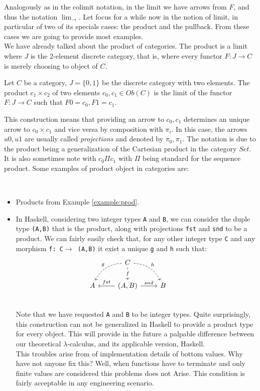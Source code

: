 Analogously as in the colimit notation, in the limit we have arrows from $F$, and thus the notation $\lim_{\rightarrow}$. Let focus for a while now in the notion of limit, in particular of two of its specials cases: the product and the pullback. From these cases we are going to provide most examples. \\

We have already talked about the product of categories. The product is a limit where $J$ is the 2-element discrete category, that is, where every functor $F:J\to C$ is merely choosing to object of $C$. 

\begin{definition}\label{prod-univ}
  Let $C$ be a category, $J=\{0,1\}$ be the discrete category with two elements. The product $c_1\times c_2$ of two elements $c_0,c_1\in Ob(C)$ is the limit of the functor $F:J\to C$ such that $F0 = c_0, F1= c_1$.
\end{definition}

This construction means that providing an arrow to $c_0,c_1$ determines an unique arrow to $c_0\times c_1$ and vice versa by composition with $\pi_i$. In this case, the arrows $u0, u1$ are usually called \emph{projections} and denoted by $\pi_0, \pi_1$. The notation is due to the product being a generalization of the Cartesian product in the category $Set$. It is also sometimes note with $c_0 \Pi c_1$ with $\Pi$ being standard for the sequence product. Some examples of product object in categories are:
\begin{example}\ 
\begin{itemize}
\item Products from Example \ref{example:prod}.
\item In Haskell, considering two integer types \texttt{A} and \texttt{B}, we can consider the duple type \texttt{(A,B)} that is the product, along with projections \texttt{fst} and \texttt{snd} to be a product. We can fairly easily check that, for any other integer type \texttt{C} and any morphism \texttt{f: C$\to$ (A,B)} it exist a unique \texttt{g} and \texttt{h} such that:
\[
\begin{tikzcd}
{} & C \arrow[bend right,swap,dashed]{dl}{g}
\arrow[bend left,dashed]{dr}{h} \arrow{d}[description]{f}& & \\
A  &(A,B) \arrow{l}[swap]{fst} \arrow{r}{snd} & 
B \\
\end{tikzcd}
\]
Note that we have requested \texttt{A} and \texttt{B} to be integer types. Quite surprisingly, this construction can not be generalized in Haskell to provide a product type for every object\cite{wiki:hask}. This will provide in the future a palpable difference between our theoretical $\lambda$-calculus, and its applicable version,  Haskell.\\

This troubles arise from of implementation details of bottom values. Why have not anyone fix this? Well, when functions have to terminate and only finite values are considered this problems does not Arise. This condition is fairly acceptable in any engineering scenario. 
\end{itemize}
\end{example}

